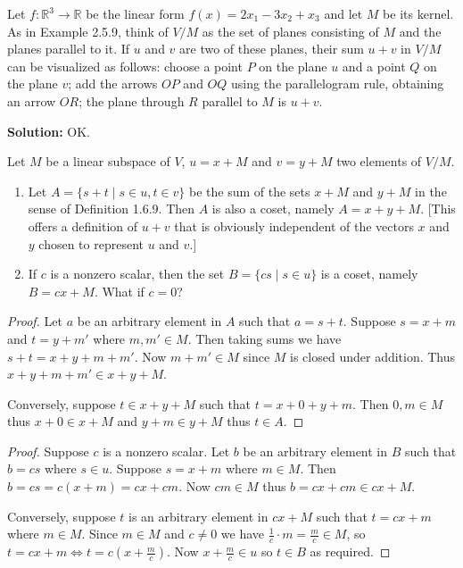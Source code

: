 \begin{tcolorbox}[title=Problem 3, breakable]
    Let $f : \mathbb{R}^3 \longrightarrow \mathbb{R}$
    be the linear form $f(x) = 2 x_1 - 3 x_2 + x_3$ and let $M$ be its 
    kernel. As in Example 2.5.9, think of $V/M$ as the set of planes consisting 
    of $M$ and the planes parallel to it. If $u$ and $v$ are two of these planes,
    their sum $u + v$ in $V/M$ can be visualized as follows: choose a point $P$
    on the plane $u$ and a point $Q$ on the plane $v$; add the arrows $OP$ and $OQ$
    using the parallelogram rule, obtaining an arrow $OR$; the plane through $R$ 
    parallel to $M$ is $u + v$.
\end{tcolorbox}

\textbf{Solution: } OK.

\newpage
\begin{tcolorbox}[title=Problem 4, breakable]
    Let $M$ be a linear subspace of $V$, $u = x + M$ and $v = y + M$ 
    two elements of $V / M$.
    \begin{enumerate}
        \item Let $A = \{s + t \mid s \in u, t \in v\}$ be the sum of the sets $x + M$ and $y + M$
              in the sense of Definition 1.6.9. Then $A$ is also a coset, namely $A = x + y + M$.
              [This offers a definition of $u + v$ that is obviously independent of the vectors $x$ and $y$
              chosen to represent $u$ and $v$.]
        \item If $c$ is a nonzero scalar, then the set $B = \{cs \mid s \in u\}$ is a coset, 
              namely $B = cx + M$. What if $c = 0$?
    \end{enumerate}
\end{tcolorbox}

\begin{proof}
    Let $a$ be an arbitrary element in $A$ such that $a = s + t$.
    Suppose $s = x + m$ and $t = y + m'$ where $m, m' \in M$.
    Then taking sums we have $s + t = x + y + m + m'$.
    Now $m + m' \in M$ since $M$ is closed under addition.
    Thus $x + y + m + m' \in x + y + M$.

    Conversely, suppose $t \in x + y + M$ such that $t = x + 0 + y + m$.
    Then $0, m \in M$ thus $x + 0 \in x + M$ and $y + m \in y + M$ thus $t \in A$.
\end{proof}

\begin{proof}
    Suppose $c$ is a nonzero scalar.
    Let $b$ be an arbitrary element in $B$ such that $b = cs$ where $s \in u$.
    Suppose $s = x + m$ where $m \in M$. Then $b = cs = c(x + m) = cx + cm$.
    Now $cm \in M$ thus $b = cx + cm \in cx + M$.

    Conversely, suppose $t$ is an arbitrary element in $cx + M$ such that $t = cx + m$ where $m \in M$.
    Since $m \in M$ and $c \ne 0$ we have $\frac{1}{c} \cdot m =  \frac{m}{c} \in M$, so $t = cx + m \iff t = c(x + \frac{m}{c})$.
    Now $x + \frac{m}{c} \in u$ so $t \in B$ as required.
\end{proof}

